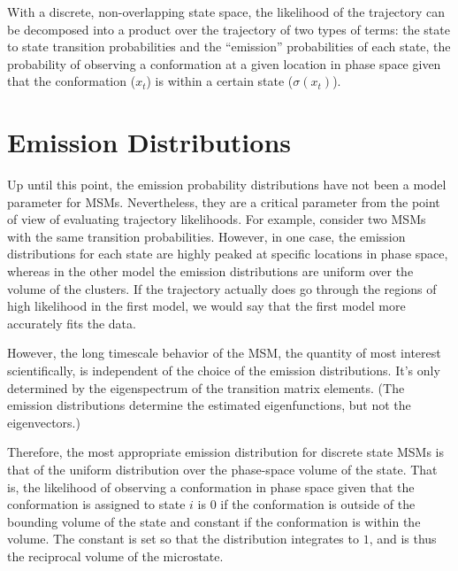 \documentclass[twocolumn,floatfix,nofootinbib,aps]{revtex4-1}
\begin{document}
With a discrete, non-overlapping state space, the likelihood of the
trajectory can be decomposed into a product over the trajectory of two
types of terms: the state to state transition probabilities and the
``emission'' probabilities of each state, the probability of observing a
conformation at a given location in phase space given that the
conformation ($x_t$) is within a certain state ($\sigma(x_t)$).

\section{Emission Distributions}

Up until this point, the emission probability distributions have not
been a model parameter for MSMs. Nevertheless, they are a critical
parameter from the point of view of evaluating trajectory likelihoods.
For example, consider two MSMs with the same transition probabilities.
However, in one case, the emission distributions for each state are
highly peaked at specific locations in phase space, whereas in the other
model the emission distributions are uniform over the volume of the
clusters. If the trajectory actually does go through the regions of high
likelihood in the first model, we would say that the first model more
accurately fits the data.

However, the long timescale behavior of the MSM, the quantity of most
interest scientifically, is independent of the choice of the emission
distributions. It's only determined by the eigenspectrum of the
transition matrix elements. (The emission distributions determine the
estimated eigenfunctions, but not the eigenvectors.)

Therefore, the most appropriate emission distribution for discrete state
MSMs is that of the uniform distribution over the phase-space volume of
the state. That is, the likelihood of observing a conformation in phase
space given that the conformation is assigned to state $i$ is $0$
if the conformation is outside of the bounding volume of the state and
constant if the conformation is within the volume. The constant is set
so that the distribution integrates to $1$, and is thus the reciprocal
volume of the microstate.

\end{document}

